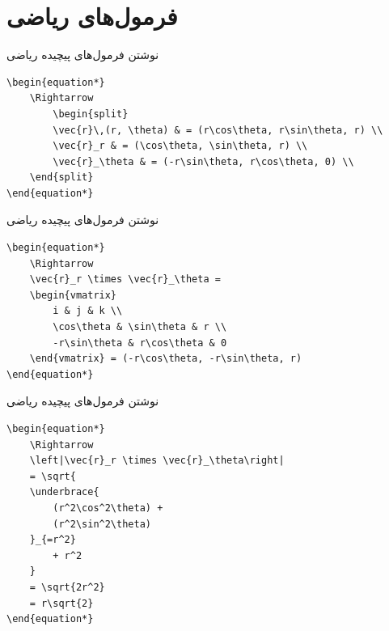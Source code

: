 \section{فرمول‌های ریاضی}
\begin{frame}[fragile]{نوشتن فرمول‌های پیچیده ریاضی}
\begin{latin}
\begin{lstlisting}[keywords={begin, end}, keywordstyle=\color{Mulberry}\textbf, numbers=none]
\begin{equation*}
    \Rightarrow
        \begin{split}
        \vec{r}\,(r, \theta) & = (r\cos\theta, r\sin\theta, r) \\
        \vec{r}_r & = (\cos\theta, \sin\theta, r) \\
        \vec{r}_\theta & = (-r\sin\theta, r\cos\theta, 0) \\
    \end{split}
\end{equation*}
\end{lstlisting}
\end{latin}
\end{frame}


\begin{frame}[fragile]{نوشتن فرمول‌های پیچیده ریاضی}
\begin{latin}
\begin{lstlisting}[keywords={begin, end}, keywordstyle=\color{Mulberry}\textbf, numbers=none]
\begin{equation*}
    \Rightarrow
    \vec{r}_r \times \vec{r}_\theta = 
    \begin{vmatrix}
        i & j & k \\
        \cos\theta & \sin\theta & r \\
        -r\sin\theta & r\cos\theta & 0 
    \end{vmatrix} = (-r\cos\theta, -r\sin\theta, r)
\end{equation*}
\end{lstlisting}
\end{latin}
\end{frame}

\begin{frame}[fragile]{نوشتن فرمول‌های پیچیده ریاضی}
\begin{latin}
\begin{lstlisting}[keywords={begin, end}, keywordstyle=\color{Mulberry}\textbf, numbers=none]
\begin{equation*}
    \Rightarrow
    \left|\vec{r}_r \times \vec{r}_\theta\right|
    = \sqrt{
    \underbrace{
        (r^2\cos^2\theta) +
        (r^2\sin^2\theta)
    }_{=r^2}
        + r^2
    }
    = \sqrt{2r^2}
    = r\sqrt{2} 
\end{equation*}
\end{lstlisting}
\end{latin}
\end{frame}


